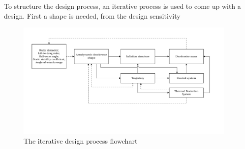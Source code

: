 To structure the design process, an iterative process is used to come up with a design. First a shape is needed, from the design sensitivity 

\begin{figure}[h!]
		\vspace{-1cm}
		\includegraphics[width=0.96\textwidth]{./Figure/DesignIterationPhilosophy.pdf}
		\vspace{-2.3cm}
		\caption{The iterative design process flowchart}
		\label{fig:rot}
\end{figure}
